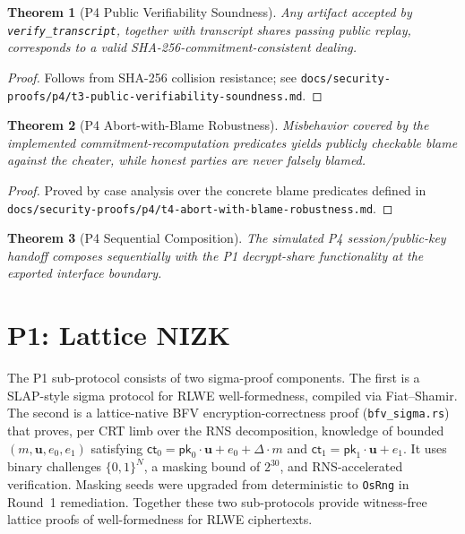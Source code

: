 \documentclass{llncs}
\newtheorem{theorem}{Theorem}[section]
\begin{document}
\begin{theorem}[P4 Public Verifiability Soundness]
\label{thm:p4-t3}
Any artifact accepted by \texttt{verify\_transcript}, together with transcript shares passing
public replay, corresponds to a valid SHA-256-commitment-consistent dealing.
\end{theorem}
\begin{proof}
Follows from SHA-256 collision resistance; see \texttt{docs/security-proofs/p4/t3-public-verifiability-soundness.md}.
\end{proof}

\begin{theorem}[P4 Abort-with-Blame Robustness]
\label{thm:p4-t4}
Misbehavior covered by the implemented commitment-recomputation predicates yields
publicly checkable blame against the cheater, while honest parties are never falsely blamed.
\end{theorem}
\begin{proof}
Proved by case analysis over the concrete blame predicates defined in \texttt{docs/security-proofs/p4/t4-abort-with-blame-robustness.md}.
\end{proof}

\begin{theorem}[P4 Sequential Composition]
\label{thm:p4-t5}
The simulated P4 session/public-key handoff composes sequentially with the P1
decrypt-share functionality at the exported interface boundary.
\end{theorem}

\section{P1: Lattice NIZK}
\label{sec:p1}

The P1 sub-protocol consists of two sigma-proof components. The first is a SLAP-style
sigma protocol for RLWE well-formedness, compiled via Fiat--Shamir. The second is a
lattice-native BFV encryption-correctness proof (\texttt{bfv\_sigma.rs}) that proves,
per CRT limb over the RNS decomposition, knowledge of bounded $(m, \mathbf{u}, e_0, e_1)$
satisfying $\mathsf{ct}_0 = \mathsf{pk}_0 \cdot \mathbf{u} + e_0 + \Delta \cdot m$
and $\mathsf{ct}_1 = \mathsf{pk}_1 \cdot \mathbf{u} + e_1$. It uses binary challenges
$\{0,1\}^N$, a masking bound of $2^{30}$, and RNS-accelerated verification. Masking
seeds were upgraded from deterministic to \texttt{OsRng} in Round~1 remediation.
Together these two sub-protocols provide witness-free lattice proofs of well-formedness
for RLWE ciphertexts.
\end{document}
